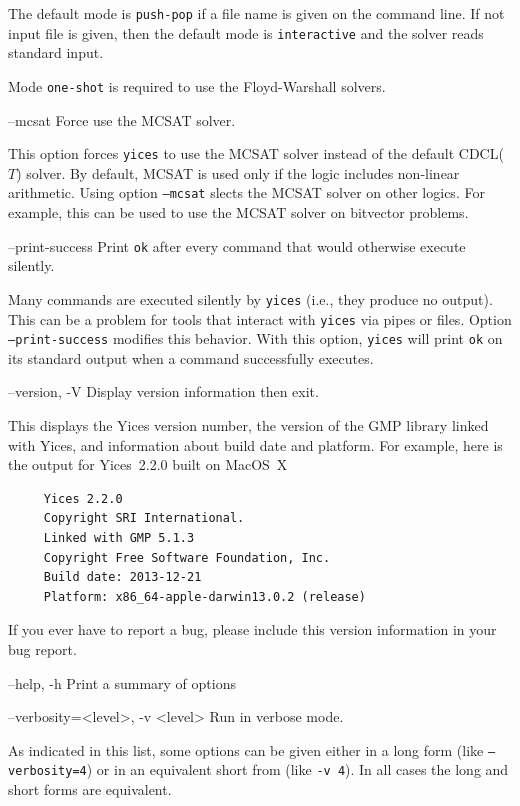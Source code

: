 \documentclass[11pt,twoside,fleqn,openright,titlepage]{cslreport}
\newenvironment{options}{
\begin{list}{}{
\setlength{\labelsep}{1.8ex}
\setlength{\labelwidth}{0pt}
\setlength{\itemindent}{-0.5\leftmargin}
\settowidth{\leftmargin}{\texttt{--}}
\renewcommand{\makelabel}{\optionlabel}}}
{\end{list}}
\newcommand*\optionlabel[1]{\hspace\labelsep\texttt{#1}}
\begin{document}
\begin{options}
  The default mode is \texttt{push-pop} if a file name is given on the
  command line. If  not input file is given, then  the default mode is
  \texttt{interactive} and the solver reads standard input.

  Mode \texttt{one-shot} is required to use the Floyd-Warshall solvers.

\item[--mcsat] Force use the MCSAT solver.

  This option forces \texttt{yices} to use the MCSAT solver instead of
  the default CDCL($T$) solver. By default, MCSAT is used only if the
  logic includes non-linear arithmetic. Using option \texttt{--mcsat}
  slects the MCSAT solver on other logics. For example, this can be
  used to use the MCSAT solver on bitvector problems.

\item[--print-success] Print \texttt{ok} after every command that would
  otherwise execute silently.

  Many commands are executed silently by \texttt{yices} (i.e., they
  produce no output). This can be a problem for tools that interact
  with \texttt{yices} via pipes or files. Option
  \texttt{--print-success} modifies this behavior. With this option,
  \texttt{yices} will print \texttt{ok} on its standard output when a
  command successfully executes.

\item[--version, -V] Display version information then exit.

  This  displays the  Yices version  number,  the version  of the  GMP
  library  linked with  Yices, and  information about  build date  and
  platform. For example,  here is the output for  Yices~2.2.0 built on
  MacOS~X
  \begin{small}
  \begin{verbatim}
     Yices 2.2.0
     Copyright SRI International.
     Linked with GMP 5.1.3
     Copyright Free Software Foundation, Inc.
     Build date: 2013-12-21
     Platform: x86_64-apple-darwin13.0.2 (release)
  \end{verbatim}
  \end{small}
  \vspace*{-1em}
  If you ever have to report a bug, please include this version information
  in your bug report.

\item[--help, -h] Print a summary of options

\item[--verbosity=<level>, -v <level>] Run in verbose mode.
\end{options}
As indicated in this list, some options can be given either in a long
form (like \texttt{--verbosity=4}) or in an equivalent short from (like
\texttt{-v 4}). In all cases the long and short forms are equivalent.
\end{document}

